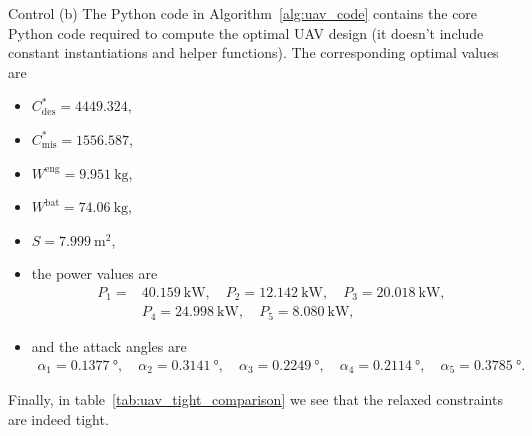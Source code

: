 \begin{chapter}{Control}
    \vspace{0.3cm}
    \noindent (b) The Python code in Algorithm~\ref{alg:uav_code} contains the core Python code
    required to compute the optimal UAV design (it doesn't include constant instantiations and helper functions).
    The corresponding optimal values are
    \begin{itemize}
        \item $C^{*}_{\mathrm{des}} = 4449.324$,
        \item $C^{*}_{\mathrm{mis}} = 1556.587$,
        \item $W^{\mathrm{eng}} = \SI{9.951}{\kilo\gram}$,
        \item $W^{\mathrm{bat}} = \SI{74.06}{\kilo\gram}$,
        \item $S = \SI{7.999}{\square\meter}$,
        \item the power values are
            \[
            \begin{aligned}P_1 = &\SI{40.159}{\kilo\watt}, \quad
            P_2 = \SI{12.142}{\kilo\watt}, \quad
            P_3 = \SI{20.018}{\kilo\watt}, \\
            &P_4 = \SI{24.998}{\kilo\watt}, \quad
            P_5 = \SI{8.080}{\kilo\watt},
            \end{aligned}
            \]
        \item and the attack angles are
        \[
            \begin{aligned}
            \alpha_1 = \SI{0.1377}{\degree}, \quad
            \alpha_2 = \SI{0.3141}{\degree}, \quad
            \alpha_3 = \SI{0.2249}{\degree}, \quad
            \alpha_4 = \SI{0.2114}{\degree}, \quad
            \alpha_5 = \SI{0.3785}{\degree}.
            \end{aligned}
            \]
    \end{itemize}
    Finally, in table~\ref{tab:uav_tight_comparison} we see that the relaxed constraints are indeed tight.


\end{chapter}
